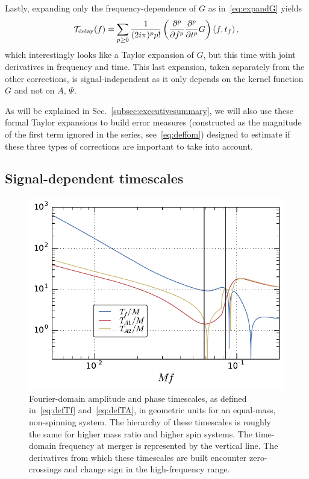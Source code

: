 \documentclass[aps,showpacs,twocolumn,
prd,superscriptaddress,nofootinbib]{revtex4-1}
\newcommand{\be}{\begin{equation}}
\newcommand{\ee}{\end{equation}}
\newcommand\calT{{\mathcal{T}}}
\newcommand{\tf}{t_{f}}
\begin{document}
Lastly, expanding only the frequency-dependence of $G$ as in~\eqref{eq:expandG} yields
\be\label{eq:resulttaylordelay}
	\calT_{\rm delay}(f) = \sum\limits_{p\geq 0} \frac{1}{(2i\pi)^{p}p!} \left( \frac{\partial^{p} }{\partial f^{p}} \frac{\partial^{p} }{\partial t^{p}} G \right)(f,\tf) \,,
\ee
which interestingly looks like a Taylor expansion of $G$, but this time with joint derivatives in frequency and time. This last expansion, taken separately from the other corrections, is signal-independent as it only depends on the kernel function $G$ and not on $A$, $\Psi$.

As will be explained in Sec.~\ref{subsec:executivesummary}, we will also use these formal Taylor expansions to build error measures (constructed as the magnitude of the first term ignored in the series, see~\eqref{eq:deffom}) designed to estimate if these three types of corrections are important to take into account.


\subsection{Signal-dependent timescales}
\label{subsec:timescales}

\begin{figure}
  \centering
  \includegraphics[width=.98\linewidth]{plots/TfTA_py.pdf}
  \caption{Fourier-domain amplitude and phase timescales, as defined in~\eqref{eq:defTf} and~\eqref{eq:defTA}, in geometric units for an equal-mass, non-spinning system. The hierarchy of these timescales is roughly the same for higher mass ratio and higher spin systems. The time-domain frequency at merger is represented by the vertical line. The derivatives from which these timescales are built encounter zero-crossings and change sign in the high-frequency range.}
  \label{fig:TfTA}
\end{figure}
\end{document}
